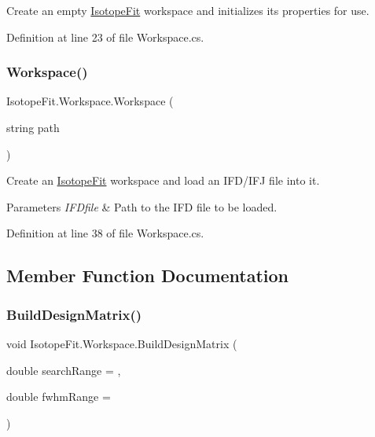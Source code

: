 Create an empty \mbox{\hyperlink{namespace_isotope_fit}{Isotope\+Fit}} workspace and initializes its properties for use. 



Definition at line 23 of file Workspace.\+cs.

\mbox{\label{class_isotope_fit_1_1_workspace_a5aa1f6546513d331f262d383fe6b0358}} 
\subsubsection{\texorpdfstring{Workspace()}{Workspace()}\hspace{0.1cm}{\footnotesize\ttfamily [2/2]}}
{\footnotesize\ttfamily Isotope\+Fit.\+Workspace.\+Workspace (\begin{DoxyParamCaption}\item[{string}]{path }\end{DoxyParamCaption})}



Create an \mbox{\hyperlink{namespace_isotope_fit}{Isotope\+Fit}} workspace and load an I\+F\+D/\+I\+FJ file into it. 


\begin{DoxyParams}{Parameters}
{\em I\+F\+Dfile} & Path to the I\+FD file to be loaded.\\
\hline
\end{DoxyParams}


Definition at line 38 of file Workspace.\+cs.



\subsection{Member Function Documentation}
\mbox{\label{class_isotope_fit_1_1_workspace_a760f024c67d57242c40c558298bd1878}} 
\subsubsection{\texorpdfstring{Build\+Design\+Matrix()}{BuildDesignMatrix()}}
{\footnotesize\ttfamily void Isotope\+Fit.\+Workspace.\+Build\+Design\+Matrix (\begin{DoxyParamCaption}\item[{double}]{search\+Range = {},  }\item[{double}]{fwhm\+Range = {} }\end{DoxyParamCaption})}



